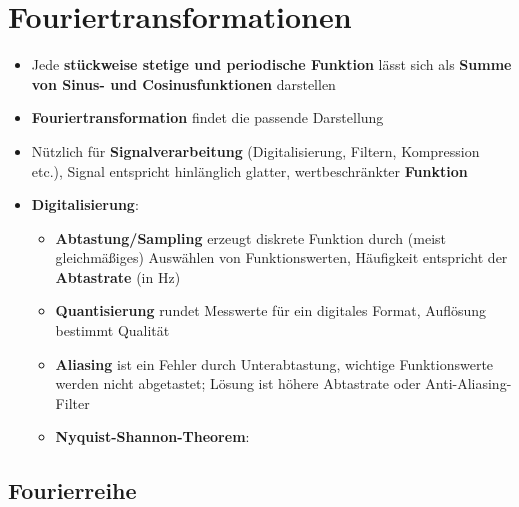 \section{Fouriertransformationen}%
\label{four:sec:fouriertransformationen}

\begin{itemize}
	\item Jede \textbf{stückweise stetige und periodische Funktion} lässt sich als \textbf{Summe von Sinus- und Cosinusfunktionen} darstellen
	\item \textbf{Fouriertransformation} findet die passende Darstellung
	\item Nützlich für \textbf{Signalverarbeitung} (Digitalisierung, Filtern, Kompression etc.), Signal entspricht hinlänglich glatter, wertbeschränkter \textbf{Funktion}
	\item \textbf{Digitalisierung}:
	\begin{itemize}
		\item \textbf{Abtastung/Sampling} erzeugt diskrete Funktion durch (meist gleichmäßiges) Auswählen von Funktionswerten, Häufigkeit entspricht der \textbf{Abtastrate} (in Hz)
		\item \textbf{Quantisierung} rundet Messwerte für ein digitales Format, Auflösung bestimmt Qualität
		\item \textbf{Aliasing} ist ein Fehler durch Unterabtastung, wichtige Funktionswerte werden nicht abgetastet; Lösung ist höhere Abtastrate oder Anti-Aliasing-Filter
		\item \textbf{Nyquist-Shannon-Theorem}: 
	\end{itemize}
\end{itemize}

\subsection{Fourierreihe}%
\label{four:sub:fourierreihe}

